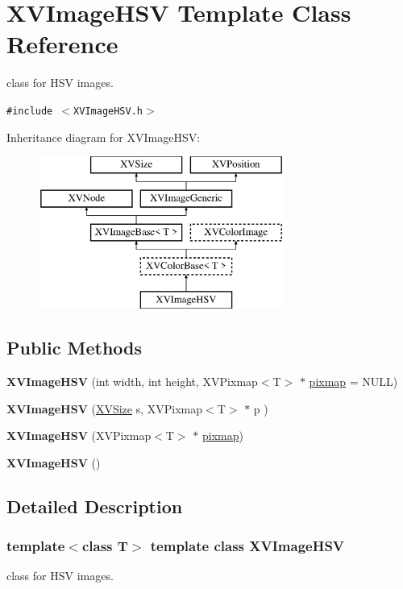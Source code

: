 \hypertarget{class_XVImageHSV}{
\section{XVImage\-HSV  Template Class Reference}
\label{XVImageHSV}
}
class for HSV images. 


{\tt \#include $<$XVImage\-HSV.h$>$}

Inheritance diagram for XVImage\-HSV:\begin{figure}[H]
\begin{center}
\leavevmode
\includegraphics[height=5cm]{class_XVImageHSV}
\end{center}
\end{figure}
\subsection*{Public Methods}
\begin{CompactItemize}
\item 
{\bf XVImage\-HSV} (int width, int height, XVPixmap$<$T$>$ $\ast$ \hyperlink{class_XVImageBase_n1}{pixmap} = NULL)
\item 
{\bf XVImage\-HSV} (\hyperlink{class_XVSize}{XVSize} s, XVPixmap$<$T$>$ $\ast$ p )
\item 
{\bf XVImage\-HSV} (XVPixmap$<$T$>$ $\ast$ \hyperlink{class_XVImageBase_n1}{pixmap})
\item 
{\bf XVImage\-HSV} ()
\end{CompactItemize}


\subsection{Detailed Description}
\subsubsection*{template$<$class T$>$  template class XVImage\-HSV}

class for HSV images.





